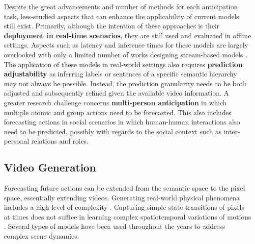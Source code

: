Despite the great advancements and number of methods for each anticipation task, less-studied aspects that can enhance the applicability of current models still exist. Primarily, although the intention of these approaches is their \textbf{deployment in real-time scenarios}, they are still used and evaluated in offline settings. Aspects such as latency and inference times for these models are largely overlooked with only a limited number of works designing stream-based models \citep{furnari2022towards,girase2023latency}. The application of these models in real-world settings also requires \textbf{prediction adjustability} as inferring labels or sentences of a specific semantic hierarchy may not always be possible. Instead, the prediction granularity needs to be both adjusted and subsequently refined given the available video information. A greater research challenge concerns \textbf{multi-person anticipation} in which multiple atomic and group actions need to be forecasted. This also includes forecasting actions in social scenarios in which human-human interactions also need to be predicted, possibly with regards to the social context such as inter-personal relations and roles.



\subsection{Video Generation}
\label{sec:forecasting::generation}

Forecasting future actions can be extended from the semantic space to the pixel space, essentially extending videos. Generating real-world physical phenomena includes a high level of complexity \citep{finn2016unsupervised}. Capturing simple state transitions of pixels at times does not suffice in learning complex spatiotemporal variations of motions \citep{wu2021motionrnn}. Several types of models have been used throughout the years to address complex scene dynamics.



